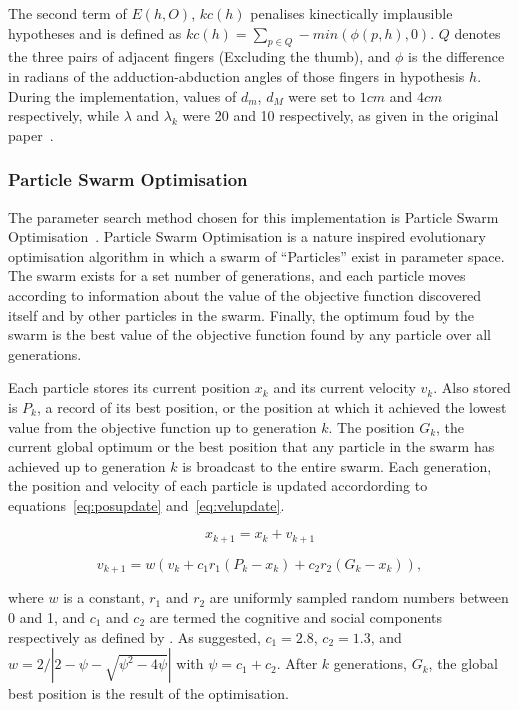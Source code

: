 \documentclass[10pt,a4paper,notitlepage,twocolumn]{report}
\begin{document}
The second term of $E(h, O)$, $kc(h)$  penalises kinectically implausible 
hypotheses and is defined as $kc(h) = \sum_{p \in Q} - min(\phi(p, h), 0)$.  $Q$ 
denotes the three pairs of adjacent fingers (Excluding the thumb), and $\phi$ is 
the difference in radians of the adduction-abduction angles of those fingers in 
hypothesis $h$.  During the implementation, values of $d_m$, $d_M$ were set to 
$1cm$ and $4cm$ respectively, while $\lambda$ and $\lambda_k$ were 20 and 10 
respectively, as given in the original paper~\cite{bmvc2011oikonom}.

		\subsubsection{Particle Swarm Optimisation}

	The parameter search method chosen for this implementation is Particle Swarm
Optimisation~\cite{kennedy1995particle}.  Particle Swarm Optimisation is a
nature inspired evolutionary optimisation algorithm in which a swarm of
``Particles'' exist in parameter space. The swarm exists for a set number of
generations, and each particle moves according to information about the value of
the objective function discovered itself and by other particles in the swarm.
Finally, the optimum foud by the swarm is the best value of the objective
function found by any particle over all generations.

	Each particle stores its current position $x_k$ and its current velocity 
	$v_k$.  Also stored is $P_k$, a record of its best position, or the position 
	at which it achieved the lowest value from the objective function up to 
	generation $k$.  The position $G_k$, the current global optimum or the best 
	position that any particle in the swarm has achieved up to generation $k$ is 
	broadcast to the entire swarm.  Each generation, the position and velocity of 
	each particle is updated accordording to equations~\ref{eq:posupdate} 
	and~\ref{eq:velupdate}.

\begin{equation}
	\label{eq:posupdate}
	x_{k+1} = x_k + v_{k+1}
\end{equation}

\begin{equation}
	\label{eq:velupdate}
	v_{k+1} = w(v_k + c_1r_1(P_k - x_k) + c_2r_2(G_k - x_k)), \end{equation}

where $w$ is a constant, $r_1$ and $r_2$ are uniformly sampled random numbers
between 0 and 1, and $c_1$ and $c_2$ are termed the cognitive and social
components respectively as defined by .  As suggested, $c_1 = 2.8$, $c_2 = 1.3$,
and $w = 2 / \left | 2 - \psi - \sqrt{\psi^2 - 4 \psi} \right |$ with $\psi =
c_1 + c_2$.  After $k$ generations, $G_k$, the global best position is the
result of the optimisation.
\end{document}
